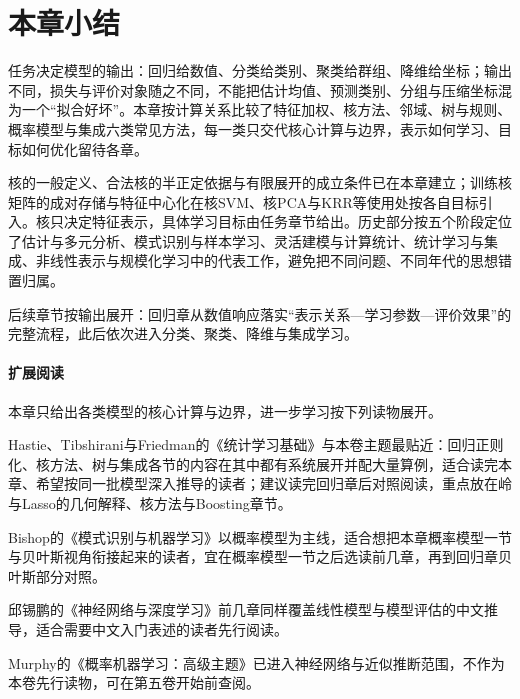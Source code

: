 \FloatBarrier
\section{本章小结}
\label{sec:classic-overview-summary}

任务决定模型的输出：回归给数值、分类给类别、聚类给群组、降维给坐标；输出不同，损失与评价对象随之不同，不能把估计均值、预测类别、分组与压缩坐标混为一个“拟合好坏”。本章按计算关系比较了特征加权、核方法、邻域、树与规则、概率模型与集成六类常见方法，每一类只交代核心计算与边界，表示如何学习、目标如何优化留待各章。

核的一般定义、合法核的半正定依据与有限展开的成立条件已在本章建立；训练核矩阵的成对存储与特征中心化在核SVM、核PCA与KRR等使用处按各自目标引入。核只决定特征表示，具体学习目标由任务章节给出。历史部分按五个阶段定位了估计与多元分析、模式识别与样本学习、灵活建模与计算统计、统计学习与集成、非线性表示与规模化学习中的代表工作，避免把不同问题、不同年代的思想错置归属。

后续章节按输出展开：回归章从数值响应落实“表示关系—学习参数—评价效果”的完整流程，此后依次进入分类、聚类、降维与集成学习。

\paragraph{扩展阅读}
本章只给出各类模型的核心计算与边界，进一步学习按下列读物展开。

Hastie、Tibshirani与Friedman的《统计学习基础》与本卷主题最贴近：回归正则化、核方法、树与集成各节的内容在其中都有系统展开并配大量算例，适合读完本章、希望按同一批模型深入推导的读者；建议读完回归章后对照阅读，重点放在岭与Lasso的几何解释、核方法与Boosting章节。

Bishop的《模式识别与机器学习》以概率模型为主线，适合想把本章概率模型一节与贝叶斯视角衔接起来的读者，宜在概率模型一节之后选读前几章，再到回归章贝叶斯部分对照。

邱锡鹏的《神经网络与深度学习》前几章同样覆盖线性模型与模型评估的中文推导，适合需要中文入门表述的读者先行阅读。

Murphy的《概率机器学习：高级主题》已进入神经网络与近似推断范围，不作为本卷先行读物，可在第五卷开始前查阅。
